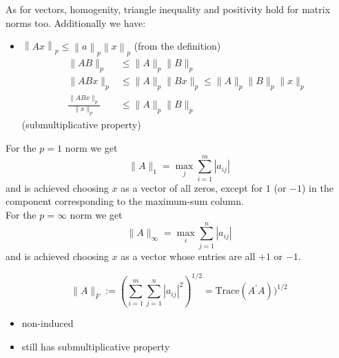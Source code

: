 
As for vectors, homogenity, triangle inequality and positivity hold for matrix norms too. Additionally we have:
\begin{itemize}
    \item $\left\|Ax\right\|_p\leq\left\|a\right\|_p\left\|x\right\|_p$ (from the definition)
          \begin{align*}
              \|AB\|_p                  & \leq\|A\|_p\|B\|_p                           \\
              \|ABx\|_p                 & \leq\|A\|_p\|Bx\|_p\leq\|A\|_p\|B\|_p\|x\|_p \\
              \frac{\|ABx\|_p}{\|x\|_p} & \leq\|A\|_p\|B\|_p
          \end{align*} (submultiplicative property)
\end{itemize}


For the $p = 1$ norm we get
\begin{equation*}
    \|A\|_1=\max_j\sum_{i=1}^m|a_{ij}|
\end{equation*}
and is achieved choosing $x$ as a vector of all zeros, except for $1$ (or $-1$) in the component corresponding to the maximum-sum column.\\

For the $p = \infty$ norm we get
\begin{equation*}
    \|A\|_\infty=\max_i\sum_{j=1}^n|a_{ij}|
\end{equation*}
and is achieved choosing $x$ as a vector whose entries are all $+1$ or $-1$.


\begin{equation*}
    \|A\|_F:=\left(\sum_{i=1}^m\sum_{j=1}^n|a_{ij}|^2\right)^{1/2}=\text{Trace}(A^{\prime}A))^{1/2}
\end{equation*}

\begin{itemize}
    \item non-induced
    \item still has submultiplicative property
\end{itemize}
